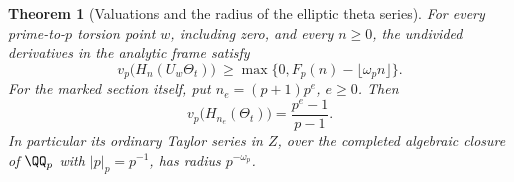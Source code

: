 \documentclass[a4paper,11pt]{article}
\newtheorem{theorem}[proposition]{Theorem}
\theoremstyle{definition}
\theoremstyle{remark}
\numberwithin{equation}{section}
\begin{document}
\begin{theorem}[Valuations and the radius of the elliptic theta series]\label{thm:powers64}
For every prime-to-\(p\) torsion point \(w\), including zero, and
every \(n\ge0\), the undivided derivatives in the analytic frame
satisfy
\begin{equation}
 v_p\big(H_n(U_w\Theta_t)\big)\ \ge     \max\{0,F_p(n)-\lfloor\omega_p n\rfloor\}.             \label{eq:higher64}
\end{equation}
For the marked section itself, put \(n_e=(p+1)p^e\), \(e\ge0\).
Then
\begin{equation}
     v_p\big(H_{n_e}(\Theta_t)\big)=\frac{p^e-1}{p-1}.    \label{eq:exact64}
\end{equation}
In particular its ordinary Taylor series in \(Z\), over the completed
algebraic closure of \(\QQ_p\) with \(|p|_p=p^{-1}\), has radius
\(p^{-\omega_p}\).
\end{theorem}
\end{document}
